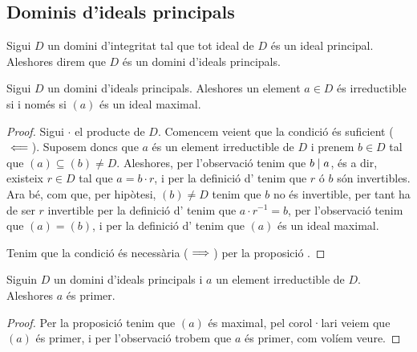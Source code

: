 \documentclass[../../Main.tex]{subfiles}
\begin{document}
	\subsection{Dominis d'ideals principals}
	\begin{definition}
		\label{def:domini d'ideals principals}
		\label{def:DIP}
		Sigui \(D\) un domini d'integritat tal que tot ideal de \(D\) és un ideal principal. Aleshores direm que \(D\) és un domini d'ideals principals.
	\end{definition}
	\begin{proposition}
		\label{prop:irreductible sii ideal maximal}
		Sigui \(D\) un domini d'ideals principals. Aleshores un element \(a\in D\) és irreductible si i només si \((a)\) és un ideal maximal.
		\begin{proof}
			Sigui \(\cdot\) el producte de \(D\). Comencem veient que la condició és suficient (\(\impliedby\)). Suposem doncs que \(a\) és un element irreductible de \(D\) i prenem \(b\in D\) tal que \((a)\subseteq(b)\neq D\). Aleshores, per l'observació  tenim que \(b\mathrel{|} a\), és a dir, existeix \(r\in D\) tal que \(a=b\cdot r\), i per la definició d' tenim que \(r\) ó \(b\) són invertibles. Ara bé, com que, per hipòtesi, \((b)\neq D\) tenim que \(b\) no és invertible, %
			per tant ha de ser \(r\) invertible per la definició d' tenim que \(a\cdot r^{-1}=b\), per l'observació  tenim que \((a)=(b)\), i per la definició d' tenim que \((a)\) és un ideal maximal.
			
			Tenim que la condició és necessària (\(\implies\)) per la proposició . %
		\end{proof}
	\end{proposition}
	\begin{proposition}
		\label{prop:en DIP irreductible implica primer}
		Siguin \(D\) un domini d'ideals principals i \(a\) un element irreductible de \(D\). Aleshores \(a\) és primer.
		\begin{proof}
			Per la proposició  tenim que \((a)\) és maximal, pel corol·lari  veiem que \((a)\) és primer, i per l'observació  trobem que \(a\) és primer, com volíem veure.
		\end{proof}
	\end{proposition}
\end{document}
